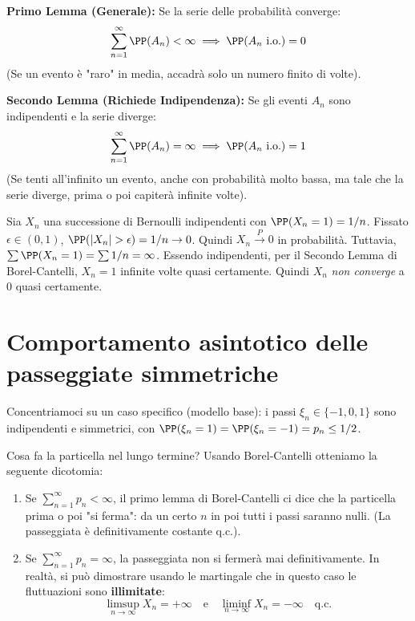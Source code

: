 \begin{theorem}
\textbf{Primo Lemma (Generale):} Se la serie delle probabilità converge:
\[ \sum_{n=1}^\infty \PP(A_n) < \infty \implies \PP(A_n \text{ i.o.}) = 0 \]
(Se un evento è "raro" in media, accadrà solo un numero finito di volte).

\textbf{Secondo Lemma (Richiede Indipendenza):} Se gli eventi $A_n$ sono indipendenti e la serie diverge:
\[ \sum_{n=1}^\infty \PP(A_n) = \infty \implies \PP(A_n \text{ i.o.}) = 1 \]
(Se tenti all'infinito un evento, anche con probabilità molto bassa, ma tale che la serie diverge, prima o poi capiterà infinite volte).
\end{theorem}

\begin{esempio}
Sia $X_n$ una successione di Bernoulli indipendenti con $\PP(X_n = 1) = 1/n$.
Fissato $\epsilon \in (0, 1)$, $\PP(|X_n| > \epsilon) = 1/n \to 0$. Quindi $X_n \stackrel{P}{\to} 0$ in probabilità.
Tuttavia, $\sum \PP(X_n = 1) = \sum 1/n = \infty$. Essendo indipendenti, per il Secondo Lemma di Borel-Cantelli, $X_n = 1$ infinite volte quasi certamente. Quindi $X_n$ \emph{non converge} a 0 quasi certamente.
\end{esempio}

\section{Comportamento asintotico delle passeggiate simmetriche}

Concentriamoci su un caso specifico (modello base): i passi $\xi_n \in \{-1, 0, 1\}$ sono indipendenti e simmetrici, con $\PP(\xi_n = 1) = \PP(\xi_n = -1) = p_n \le 1/2$.

Cosa fa la particella nel lungo termine?
Usando Borel-Cantelli otteniamo la seguente dicotomia:
\begin{enumerate}
    \item Se $\sum_{n=1}^\infty p_n < \infty$, il primo lemma di Borel-Cantelli ci dice che la particella prima o poi "si ferma": da un certo $n$ in poi tutti i passi saranno nulli. (La passeggiata è definitivamente costante q.c.).
    \item Se $\sum_{n=1}^\infty p_n = \infty$, la passeggiata non si fermerà mai definitivamente. In realtà, si può dimostrare usando le martingale che in questo caso le fluttuazioni sono \textbf{illimitate}:
    \[ \limsup_{n \to \infty} X_n = +\infty \quad \text{e} \quad \liminf_{n \to \infty} X_n = -\infty \quad \text{q.c.} \]
\end{enumerate}

